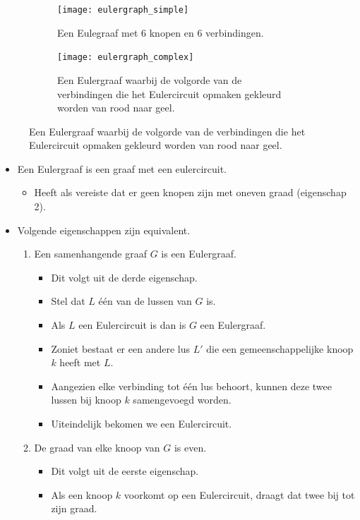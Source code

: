 \begin{figure}[ht]
\centering
\begin{subfigure}{.5\textwidth}
	\centering
	\texttt{[image: eulergraph\_simple]}
	\caption{Een Eulegraaf met 6 knopen en 6 verbindingen.}
	\label{fig:eulergraph_simple}
  \end{subfigure}%
  \begin{subfigure}{.5\textwidth}
	\centering
	\texttt{[image: eulergraph\_complex]}
	\caption{Een Eulergraaf waarbij de volgorde van de verbindingen die het Eulercircuit opmaken gekleurd worden van rood naar geel.}
	\label{fig:eulergraph_complex}
  \end{subfigure}
\end{figure}

\begin{itemize}
	\item Een Eulergraaf is een graaf met een eulercircuit. 
	\begin{itemize}
		\item Heeft als vereiste dat er geen knopen zijn met oneven graad (eigenschap 2).
	\end{itemize}
	\item Volgende eigenschappen zijn equivalent.
	\begin{enumerate}
		\item Een samenhangende graaf $G$ is een Eulergraaf.
		\begin{itemize}
			\item Dit volgt uit de derde eigenschap.
			\item Stel dat $L$ één van de lussen van $G$ is.
			\item Als $L$ een Eulercircuit is dan is $G$ een Eulergraaf.
			\item Zoniet bestaat er een andere lus $L'$ die een gemeenschappelijke knoop $k$ heeft met $L$.
			\item Aangezien elke verbinding tot één lus behoort, kunnen deze twee lussen bij knoop $k$ samengevoegd worden.
			\item Uiteindelijk bekomen we een Eulercircuit.
		\end{itemize}
		\item De graad van elke knoop van $G$ is even.
		\begin{itemize}
			\item Dit volgt uit de eerste eigenschap.
			\item Als een knoop $k$ voorkomt op een Eulercircuit, draagt dat twee bij tot zijn graad.
			\begin{itemize}

\end{itemize}
\end{itemize}
\end{enumerate}
\end{itemize}
